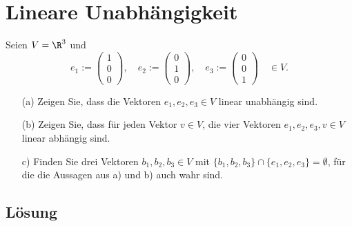 \newpage
\section{Lineare Unabh\"angigkeit}

Seien $V = \R^3$ und
$$
	e_1 :=
	\begin{pmatrix}
		1\\
		0\\
		0	
	\end{pmatrix},
	\quad
	e_2 :=
	\begin{pmatrix}
		0\\
		1\\
		0	
	\end{pmatrix},
	\quad
	e_3 :=
	\begin{pmatrix}
		0\\
		0\\
		1	
	\end{pmatrix}
	\quad
	\in V.
$$
\begin{itemize}
	\item[(a)] Zeigen Sie, dass die Vektoren $e_1, e_2, e_3 \in V$ linear unabh\"angig sind.
	\item[(b)] Zeigen Sie, dass f\"ur jeden Vektor $v\in V$, die vier Vektoren $e_1, e_2, e_3, v \in V$ linear abh\"angig sind.
	\item[c)] Finden Sie drei Vektoren $b_1,b_2,b_3 \in V$ mit $\{b_1,b_2,b_3\}\cap\{e_1,e_2,e_3\} = \emptyset$, für die die Aussagen aus a) und b) auch wahr sind.
\end{itemize}

\subsection*{L\"osung}

